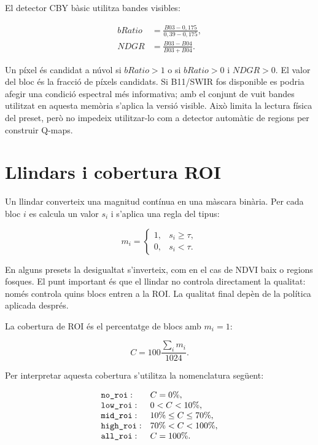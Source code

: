 El detector CBY bàsic utilitza bandes visibles:

\begin{align}
bRatio&=\frac{B03-0,175}{0,39-0,175},\\
NDGR&=\frac{B03-B04}{B03+B04}.
\end{align}

Un píxel és candidat a núvol si $bRatio>1$ o si $bRatio>0$ i $NDGR>0$. El valor
del bloc és la fracció de píxels candidats. Si B11/SWIR fos disponible es podria
afegir una condició espectral més informativa; amb el conjunt de vuit bandes
utilitzat en aquesta memòria s'aplica la versió visible. Això limita la lectura
física del preset, però no impedeix utilitzar-lo com a detector automàtic de
regions per construir Q-maps.

\section{Llindars i cobertura ROI}\label{sec:llindars}

Un llindar converteix una magnitud contínua en una màscara binària. Per cada
bloc $i$ es calcula un valor $s_i$ i s'aplica una regla del tipus:

\begin{equation}
m_i =
\begin{cases}
1,&s_i \geq \tau,\\
0,&s_i < \tau.
\end{cases}
\end{equation}

En alguns presets la desigualtat s'inverteix, com en el cas de NDVI baix o
regions fosques. El punt important és que el llindar no controla directament la
qualitat: només controla quins blocs entren a la ROI. La qualitat final depèn de
la política aplicada després.

La cobertura de ROI és el percentatge de blocs amb $m_i=1$:

\begin{equation}
C = 100\frac{\sum_i m_i}{1024}.
\end{equation}

Per interpretar aquesta cobertura s'utilitza la nomenclatura següent:

\begin{equation}
\begin{array}{ll}
\texttt{no\_roi}:&C=0\%,\\
\texttt{low\_roi}:&0<C<10\%,\\
\texttt{mid\_roi}:&10\%\leq C\leq70\%,\\
\texttt{high\_roi}:&70\%<C<100\%,\\
\texttt{all\_roi}:&C=100\%.
\end{array}
\label{eq:roi_groups_control}
\end{equation}

